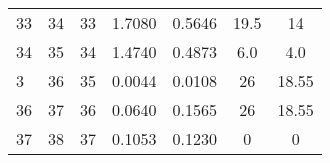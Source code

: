 \begin{table}
\begin{adjustbox}{width=0.95\textwidth,center=\textwidth}
\begin{tabular}{ccccccc}
33                                                        & 34                                                          & 33                                                  & 1.7080                                                                    & 0.5646                                                                    & 19.5                                                                        & 14                                                                               \\
34                                                        & 35                                                          & 34                                                  & 1.4740                                                                    & 0.4873                                                                    & 6.0                                                                         & 4.0                                                                              \\
3~                                                        & 36                                                          & 35                                                  & 0.0044                                                                    & 0.0108                                                                    & 26                                                                          & 18.55                                                                            \\
36                                                        & 37                                                          & 36                                                  & 0.0640                                                                    & 0.1565                                                                    & 26                                                                          & 18.55                                                                            \\
37                                                        & 38                                                          & 37                                                  & 0.1053                                                                    & 0.1230                                                                    & 0                                                                           & 0                                                                                \\

\end{tabular}
\end{adjustbox}
\end{table}
